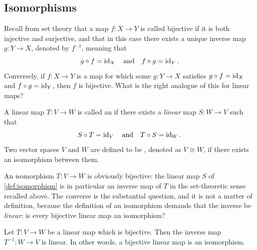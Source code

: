 \subsection{Isomorphisms}

Recall from set theory that a map $f: X \to Y$ is called bijective if it is both injective and surjective, and that in this case there exists a unique inverse map $g: Y \to X$, denoted by $f^{-1}$, meaning that
\[
g \circ f = \operatorname{id}_X \quad \text{and} \quad f \circ g = \operatorname{id}_Y.
\]
Conversely, if $f: X \to Y$ is a map for which some $g: Y \to X$ satisfies $g \circ f = \operatorname{id}_X$ and $f \circ g = \operatorname{id}_Y$, then $f$ is bijective. What is the right analogue of this for linear maps?

\begin{definition}[Isomorphism]
\label{def:isomorphism}
A linear map $T: V \to W$ is called an  if there exists a \emph{linear} map $S: W \to V$ such that
\[
S \circ T = \operatorname{id}_V \quad \text{and} \quad T \circ S = \operatorname{id}_W.
\]
Two vector spaces $V$ and $W$ are defined to be , denoted as $V \cong W$, if there exists an isomorphism between them.

\begin{center}
\end{center}

\end{definition}

\begin{remark}
\label{rem:iso_is_bijective}
An isomorphism $T: V \to W$ is obviously bijective: the linear map $S$ of \cref{def:isomorphism} is in particular an inverse map of $T$ in the set-theoretic sense recalled above. The converse is the substantial question, and it is not a matter of definition, because the definition of an isomorphism demands that the inverse be \emph{linear}: is every bijective linear map an isomorphism?
\end{remark}

\begin{lemma}
\label{lem:bijective_is_iso}
Let $T: V \to W$ be a linear map which is bijective. Then the inverse map $T^{-1}: W \to V$ is linear. In other words, a bijective linear map is an isomorphism.
\end{lemma}

